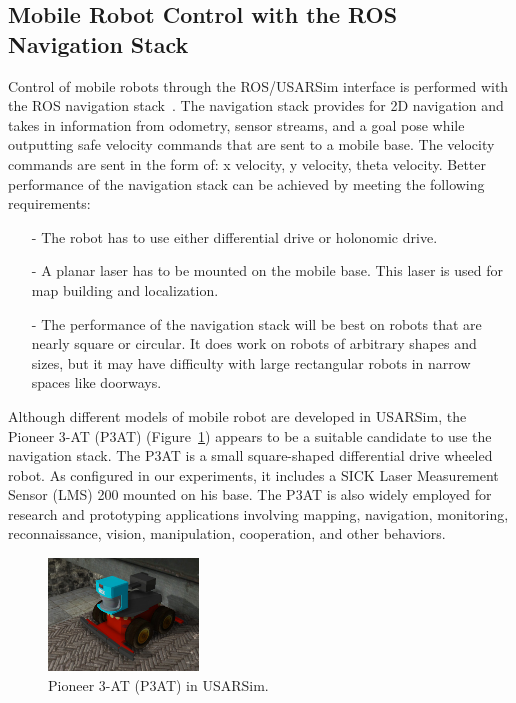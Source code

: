 \subsection*{Mobile Robot Control with the ROS Navigation Stack}
Control of mobile robots through the ROS/USARSim interface is performed with the ROS navigation stack~\cite{RosNavWeb}. The navigation stack provides for 2D navigation and takes in information from odometry, sensor streams, and a goal pose while outputting safe velocity commands that are sent to a mobile base. The velocity commands are sent in the form of: x velocity, y velocity, theta velocity. Better performance of the navigation stack can be achieved by meeting the following requirements:
\begin{itemize}
\item[-] The robot has to use either differential drive or holonomic drive.
\item[-] A planar laser has to be mounted on the mobile base. This laser is used for map building and localization.
\item[-] The performance of the navigation stack will be best on robots that are nearly square or circular. It does work on robots of arbitrary shapes and sizes, but it may have difficulty with large rectangular robots in narrow spaces like doorways.
\end{itemize}

Although different models of mobile robot are developed in USARSim, the Pioneer 3-AT (P3AT) (Figure~\ref{fig:p3at}) appears to be a suitable candidate to use the navigation stack. The P3AT is a small square-shaped differential drive wheeled robot. As configured in our experiments, it includes a SICK Laser Measurement Sensor (LMS) 200 mounted on his base. The P3AT is also widely employed for research and prototyping applications involving mapping, navigation, monitoring, reconnaissance, vision, manipulation, cooperation, and other behaviors.

\begin{figure}[t!]
\centering
\includegraphics[width=4cm]{Figures/Robots/p3at.jpg}
\caption{Pioneer 3-AT (P3AT) in USARSim.}\label{fig:p3at}
\end{figure}




